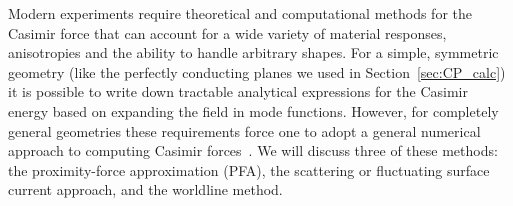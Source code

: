 Modern experiments require theoretical and computational methods
for the Casimir force that can account for a wide variety of material responses, anisotropies
and the ability to handle arbitrary shapes.  
For a simple, symmetric geometry (like the perfectly conducting planes we used in Section~\ref{sec:CP_calc})
it is possible to write down tractable analytical expressions for
the Casimir energy based on expanding the field in mode functions.
However, for completely general geometries these requirements force one to adopt a general 
numerical approach to computing Casimir forces~\cite{Johnson2011}.
We will discuss three of these methods: the proximity-force approximation (PFA), the scattering
or fluctuating surface current approach, and the worldline method.





